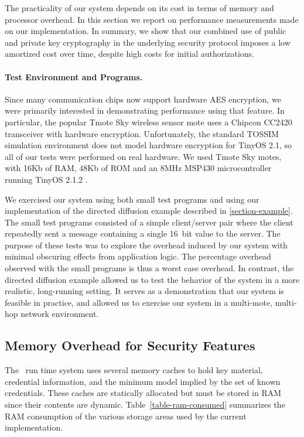 The practicality of our system depends on its cost in terms of memory
and processor overhead. In this section we report on performance
measurements made on our implementation. In summary, we show that our
combined use of public and private key cryptography in the underlying
security protocol imposes a low amortized cost over time, despite high
costs for initial authorizations.

\paragraph{Test Environment and Programs.}
Since many communication chips now support hardware AES encryption, we
were primarily interested in demonstrating performance using that
feature. In particular, the popular Tmote Sky wireless sensor mote
\cite{tmotesky-datasheet} uses a Chipcon CC2420 transceiver with
hardware encryption. Unfortunately, the standard TOSSIM simulation
environment does not model hardware encryption for TinyOS 2.1, so all
of our tests were performed on real hardware. We used Tmote Sky motes,
with 16Kb of RAM, 48Kb of ROM and an 8MHz MSP430 microcontroller
running TinyOS 2.1.2 \cite{tinyos}.

We exercised our system using both small test programs and using our
implementation of the directed diffusion example described in
\autoref{section-example}. The small test programs consisted of a
simple client/server pair where the client repeatedly sent a message
containing a single 16~bit value to the server. The purpose of these
tests was to explore the overhead induced by our system with minimal
obscuring effects from application logic. The percentage overhead
observed with the small programs is thus a worst case overhead.  In
contrast, the directed diffusion example allowed us to test the
behavior of the system in a more realistic, long-running setting. It
serves as a demonstration that our system is feasible in practice, and
allowed us to exercise our system in a multi-mote, multi-hop network
environment.

\subsection{Memory Overhead for Security Features}

The \Sprocket\ run time system uses several memory caches to hold key
material, credential information, and the minimum model implied by the
set of known credentials. These caches are statically allocated but must
be stored in RAM since their contents are dynamic.
Table~\ref{table-ram-consumed} summarizes the RAM consumption of the
various storage areas used by the current implementation.

